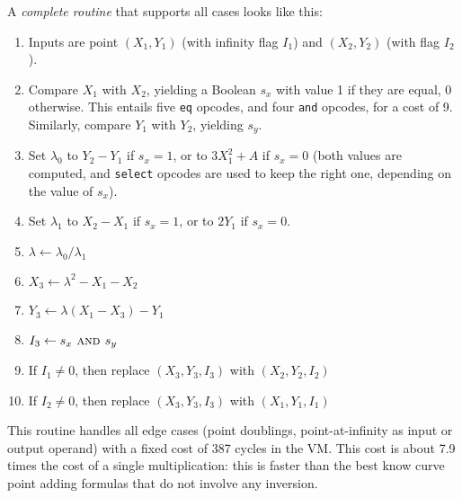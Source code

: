 \documentclass{llncs}
\begin{document}
A \emph{complete routine} that supports all cases looks like this:
\begin{enumerate}

    \item Inputs are point $(X_1, Y_1)$ (with infinity flag $I_1$) and
    $(X_2, Y_2)$ (with flag $I_2$).

    \item Compare $X_1$ with $X_2$, yielding a Boolean $s_x$ with value
    1 if they are equal, 0 otherwise. This entails five \verb+eq+ opcodes,
    and four \verb+and+ opcodes, for a cost of 9. Similarly, compare
    $Y_1$ with $Y_2$, yielding $s_y$.

    \item Set $\lambda_0$ to $Y_2 - Y_1$ if $s_x = 1$, or to $3 X_1^2 + A$
    if $s_x = 0$ (both values are computed, and \verb+select+ opcodes are
    used to keep the right one, depending on the value of $s_x$).

    \item Set $\lambda_1$ to $X_2 - X_1$ if $s_x = 1$, or to $2 Y_1$ if
    $s_x = 0$.

    \item $\lambda \leftarrow \lambda_0 / \lambda_1$

    \item $X_3 \leftarrow \lambda^2 - X_1 - X_2$

    \item $Y_3 \leftarrow \lambda (X_1 - X_3) - Y_1$

    \item $I_3 \leftarrow s_x \text{\textsc{\ and\ }} s_y$

    \item If $I_1 \neq 0$, then replace $(X_3, Y_3, I_3)$ with $(X_2, Y_2, I_2)$

    \item If $I_2 \neq 0$, then replace $(X_3, Y_3, I_3)$ with $(X_1, Y_1, I_1)$

\end{enumerate}

This routine handles all edge cases (point doublings, point-at-infinity
as input or output operand) with a fixed cost of 387 cycles in the VM.
This cost is about 7.9 times the cost of a single multiplication: this
is faster than the best know curve point adding formulas that do not
involve any inversion.
\end{document}
